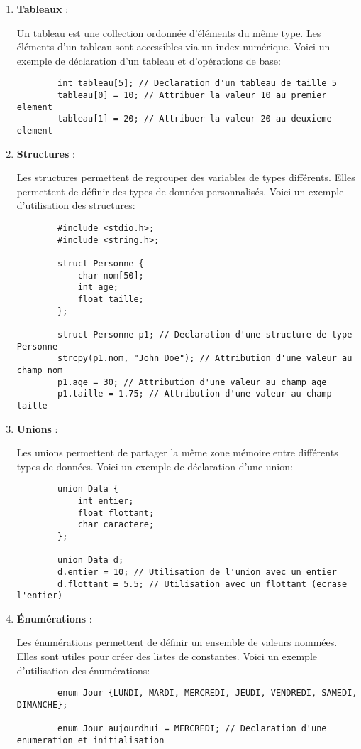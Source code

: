 \begin{enumerate}[label=\alph*)]
	\item \textbf{Tableaux} :
	
	Un tableau est une collection ordonnée d'éléments du même type. Les éléments d'un tableau sont accessibles via un index numérique. Voici un exemple de déclaration d'un tableau et d'opérations de base:
	
	\begin{lstlisting}
		int tableau[5]; // Declaration d'un tableau de taille 5
		tableau[0] = 10; // Attribuer la valeur 10 au premier element
		tableau[1] = 20; // Attribuer la valeur 20 au deuxieme element
	\end{lstlisting}
	
	\item \textbf{Structures} :
	
	Les structures permettent de regrouper des variables de types différents. Elles permettent de définir des types de données personnalisés. Voici un exemple d'utilisation des structures:
	
	\begin{lstlisting}
		#include <stdio.h>;
		#include <string.h>;
		
		struct Personne {
			char nom[50];
			int age;
			float taille;
		};
		
		struct Personne p1; // Declaration d'une structure de type Personne
		strcpy(p1.nom, "John Doe"); // Attribution d'une valeur au champ nom
		p1.age = 30; // Attribution d'une valeur au champ age
		p1.taille = 1.75; // Attribution d'une valeur au champ taille
	\end{lstlisting}
	
	\item \textbf{Unions} :
	
	Les unions permettent de partager la même zone mémoire entre différents types de données. Voici un exemple de déclaration d'une union:
	
	\begin{lstlisting}
		union Data {
			int entier;
			float flottant;
			char caractere;
		};
		
		union Data d;
		d.entier = 10; // Utilisation de l'union avec un entier
		d.flottant = 5.5; // Utilisation avec un flottant (ecrase l'entier)
	\end{lstlisting}
	
	\item \textbf{Énumérations} :
	
	Les énumérations permettent de définir un ensemble de valeurs nommées. Elles sont utiles pour créer des listes de constantes. Voici un exemple d'utilisation des énumérations:
	
	\begin{lstlisting}
		enum Jour {LUNDI, MARDI, MERCREDI, JEUDI, VENDREDI, SAMEDI, DIMANCHE};
		
		enum Jour aujourdhui = MERCREDI; // Declaration d'une enumeration et initialisation
	\end{lstlisting}
\end{enumerate}

